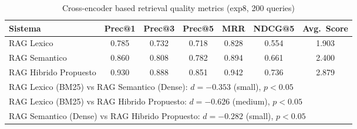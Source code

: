 \begin{table}[htbp]
\centering
\caption{Cross-encoder based retrieval quality metrics (exp8, 200 queries)}
\label{tab:retrieval-metrics}
\begin{tabular}{lcccccc}
\toprule
Sistema & Prec@1 & Prec@3 & Prec@5 & MRR & NDCG@5 & Avg.~Score \\
\midrule
RAG Lexico & 0.785 & 0.732 & 0.718 & 0.828 & 0.554 & 1.903 \\
RAG Semantico & 0.860 & 0.808 & 0.782 & 0.894 & 0.661 & 2.400 \\
RAG Hibrido Propuesto & 0.930 & 0.888 & 0.851 & 0.942 & 0.736 & 2.879 \\
\midrule
\multicolumn{7}{l}{\footnotesize RAG Lexico (BM25) vs RAG Semantico (Dense): $d=-0.353$ (small), $p<0.05$} \\
\multicolumn{7}{l}{\footnotesize RAG Lexico (BM25) vs RAG Hibrido Propuesto: $d=-0.626$ (medium), $p<0.05$} \\
\multicolumn{7}{l}{\footnotesize RAG Semantico (Dense) vs RAG Hibrido Propuesto: $d=-0.282$ (small), $p<0.05$} \\
\bottomrule
\end{tabular}
\end{table}